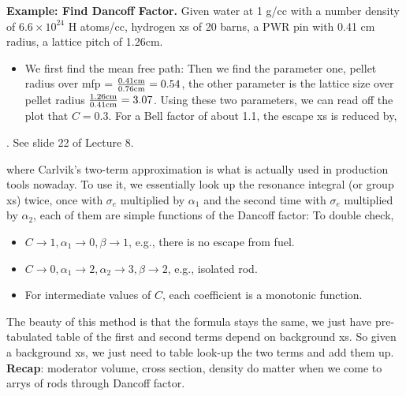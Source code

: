 \documentclass{school-22.211-notes}
\begin{document}
\textbf{Example: Find Dancoff Factor.} Given water at 1 g/cc with a number density of $6.6 \times 10^{24}$ H atoms/cc, hydrogen xs of 20 barns, a PWR pin with 0.41 cm radius, a lattice pitch of 1.26cm. 
\begin{itemize}
\item We first find the mean free path: 
Then we find the parameter one, pellet radius over mfp = $\frac{0.41 \mathrm{cm}}{0.76 \mathrm{cm}}  = 0.54$, the other parameter is the lattice size over pellet radius $\frac{1.26 \mathrm{cm}}{0.41 \mathrm{cm}} = 3.07$. Using these two parameters, we can read off the plot that $C = 0.3$. For a Bell factor of about 1.1, the escape xs is reduced by,
\end{itemize}
. See slide 22 of Lecture 8. 






\clearpage
{}
where
Carlvik's two-term approximation is what is actually used in production tools nowaday. To use it, we essentially look up the resonance integral (or group xs) twice, once with $\sigma_e$ multiplied by $\alpha_1$ and the second time with $\sigma_e$ multiplied by $\alpha_2$, each of them are simple functions of the Dancoff factor: 
To double check, 
\begin{itemize}
\item $C\to 1, \alpha_1 \to 0, \beta \to 1$, e.g., there is no escape from fuel.
\item $C\to 0, \alpha_1 \to 2, \alpha_2 \to 3, \beta \to 2$, e.g., isolated rod.
\item For intermediate values of $C$, each coefficient is a monotonic function.
\end{itemize}
The beauty of this method is that the formula stays the same, we just have pre-tabulated table of the first and second terms depend on background xs. So given a background xs, we just need to table look-up the two terms and add them up. \\
\textbf{Recap}: moderator volume, cross section, density do matter when we come to arrys of rods through Dancoff factor.
\end{document}
